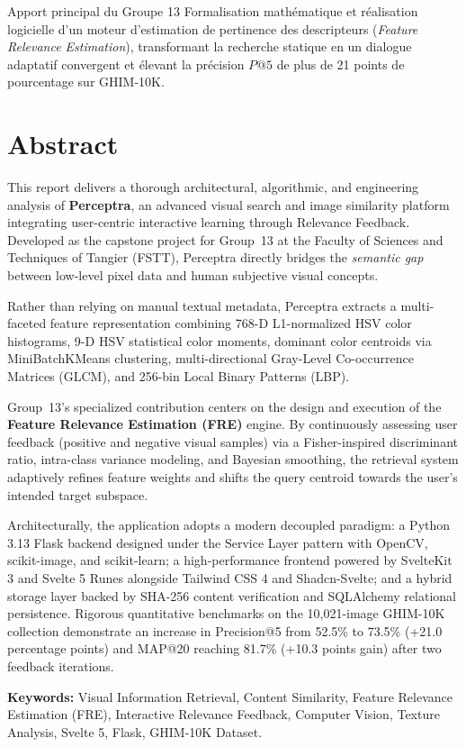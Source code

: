 \vspace{0.3cm}
\begin{infobox}{Apport principal du Groupe 13}
Formalisation mathématique et réalisation logicielle d'un moteur d'estimation de pertinence des descripteurs (\textit{Feature Relevance Estimation}), transformant la recherche statique en un dialogue adaptatif convergent et élevant la précision $P@5$ de plus de 21 points de pourcentage sur GHIM-10K.
\end{infobox}

\newpage
\chapter*{Abstract}

This report delivers a thorough architectural, algorithmic, and engineering analysis of \textbf{Perceptra}, an advanced visual search and image similarity platform integrating user-centric interactive learning through Relevance Feedback. Developed as the capstone project for Group~13 at the Faculty of Sciences and Techniques of Tangier (FSTT), Perceptra directly bridges the \textit{semantic gap} between low-level pixel data and human subjective visual concepts.

Rather than relying on manual textual metadata, Perceptra extracts a multi-faceted feature representation combining 768-D L1-normalized HSV color histograms, 9-D HSV statistical color moments, dominant color centroids via MiniBatchKMeans clustering, multi-directional Gray-Level Co-occurrence Matrices (GLCM), and 256-bin Local Binary Patterns (LBP).

Group~13's specialized contribution centers on the design and execution of the \textbf{Feature Relevance Estimation (FRE)} engine. By continuously assessing user feedback (positive and negative visual samples) via a Fisher-inspired discriminant ratio, intra-class variance modeling, and Bayesian smoothing, the retrieval system adaptively refines feature weights and shifts the query centroid towards the user's intended target subspace.

Architecturally, the application adopts a modern decoupled paradigm: a Python 3.13 Flask backend designed under the Service Layer pattern with OpenCV, scikit-image, and scikit-learn; a high-performance frontend powered by SvelteKit 3 and Svelte 5 Runes alongside Tailwind CSS 4 and Shadcn-Svelte; and a hybrid storage layer backed by SHA-256 content verification and SQLAlchemy relational persistence. Rigorous quantitative benchmarks on the 10,021-image GHIM-10K collection demonstrate an increase in Precision@5 from 52.5\% to 73.5\% (+21.0 percentage points) and MAP@20 reaching 81.7\% (+10.3 points gain) after two feedback iterations.

\vspace{0.4cm}
\noindent\textbf{Keywords:} Visual Information Retrieval, Content Similarity, Feature Relevance Estimation (FRE), Interactive Relevance Feedback, Computer Vision, Texture Analysis, Svelte 5, Flask, GHIM-10K Dataset.
